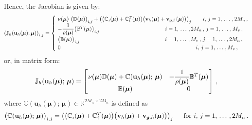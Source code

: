 \documentclass[12pt, a4paper, twoside, openright]{report}
\numberwithin{equation}{chapter}
\theoremstyle{theorem}
\theoremstyle{definition}
\theoremstyle{remark}
\theoremstyle{proposition}
\numberwithin{figure}{chapter}
\newcommand{\bg}[1]{\boldsymbol{#1}}
\begin{document}
		Hence, the Jacobian is given by:
		\begin{equation*}
			\left( \mathbb{J}_h(\mathbf{u}_h(\bg{\mu}); \bg{\mu}) \right)_{i,j} =
			\begin{cases}
				& \hspace*{-0.3cm} \nu(\bg{\mu}) ~ \big( \mathbb{D}(\bg{\mu}) \big)_{i,j} + \left( \big( \mathbb{C}_i(\bg{\mu}) + \mathbb{C}_i^T(\bg{\mu}) \big) \big( \mathbf{v}_h(\bg{\mu}) + \mathbf{v}_{\bg{g},h} (\bg{\mu}) \big) \right)_j \hspace*{0.68cm} i, \, j = 1, \, \ldots \, , 2 M_n \, , \\
				& \hspace*{-0.3cm} - \dfrac{1}{\rho(\bg{\mu})} \big( \mathbb{B}^T(\bg{\mu}) \big)_{i,j} \hspace*{4.25cm} i = 1, \, \ldots \, , 2 M_n \, , \, j = 1, \, \ldots \, , M_v \, , \\
				& \hspace*{-0.3cm} \big( \mathbb{B}(\bg{\mu}) \big)_{i,j} \hspace*{5.52cm} i = 1, \, \ldots \, , M_v \, , \, j = 1, \, \ldots \, , 2 M_n \, , \\
				& \hspace*{-0.3cm} 0 \hspace*{8.75cm} i, \, j = 1, \, \ldots \, , M_v \, ,
			\end{cases}
		\end{equation*}
		or, in matrix form:
		\begin{equation}
			\label{eq:ns-jacobian}
			\mathbb{J}_h(\mathbf{u}_h(\bg{\mu}); \, \bg{\mu}) =
			\begin{bmatrix}
			\hspace*{-0.15cm}
			\begin{array}{cc} 
				\nu(\bg{\mu}) \mathbb{D}(\bg{\mu}) + \mathbb{C}(\mathbf{u}_h(\bg{\mu}); \, \bg{\mu}) & - \dfrac{1}{\rho(\bg{\mu})} \mathbb{B}^T(\bg{\mu}) \\
				\mathbb{B}(\bg{\mu}) & 0
			\end{array}
			\hspace*{-0.15cm}
			\end{bmatrix} \, ,
		\end{equation}
		where $\mathbb{C}(\mathbf{u}_h(\bg{\mu}); \, \bg{\mu}) \in \mathbb{R}^{2 M_n \times 2 M_n}$ is defined as
		\begin{equation*}
			\big( \mathbb{C}(\mathbf{u}_h(\bg{\mu}); \, \bg{\mu}) \big)_{i,j} = \left( \big( \mathbb{C}_i(\bg{\mu}) + \mathbb{C}_i^T(\bg{\mu}) \big) \big( \mathbf{v}_h(\bg{\mu}) + \mathbf{v}_{\bg{g},h} (\bg{\mu}) \big) \right)_j \hspace*{0.5cm} \text{for $i, \, j = 1, \, \ldots \, , 2 M_n$} \, .
		\end{equation*}
		
\end{document}
